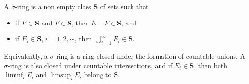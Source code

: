 A $\sigma$-ring is a non empty class $\mathbf{S}$ of sets such that
\begin{itemize}
\item[(a)] if $E \in \mathbf{S}$ and $F \in \mathbf{S}$, then $E - F \in \mathbf{S}$, and
\item[(b)] if $E_i \in \mathbf{S}$, $i = 1, 2, \cdots$, then $\bigcup_{i=1}^{\infty} E_i \in \mathbf{S}$.
\end{itemize}
Equivalently, a $\sigma$-ring is a ring closed under the formation of countable unions. A $\sigma$-ring is also closed under countable intersections, and if $E_i \in \mathbf{S}$, then both $\liminf_i E_i$ and $\limsup_i E_i$ belong to $\mathbf{S}$.
